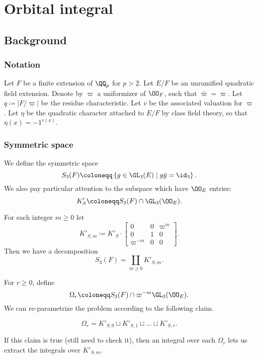 \chapter{Orbital integral}
\section{Background}
\label{sec:orbital_background}

\subsection{Notation}
\begin{itemize}
  \ii Let $F$ be a finite extension of $\QQ_p$ for $p > 2$.
  \ii Let $E/F$ be an unramified quadratic field extension.
  \ii Denote by $\varpi$ a uniformizer of $\OO_F$, such that $\bar \varpi = \varpi$.
  \ii Let $q \coloneqq |F/\varpi|$ be the residue characteristic.
  \ii Let $v$ be the associated valuation for $\varpi$.
  \ii Let $\eta$ be the quadratic character attached to $E/F$ by class field theory,
  so that $\eta(x) = -1^{v(x)}$.
\end{itemize}

\subsection{Symmetric space}
We define the symmetric space
\[ S_3(F) \coloneqq \left\{ g \in \GL_3(E) \mid g \bar{g} = \id_3 \right\}. \]
We also pay particular attention to the subspace which have $\OO_E$ entries:
\[ K'_S \coloneqq S_3(F) \cap \GL_3(\OO_E). \]
\begin{lemma}
  For each integer $m \ge 0$ let
  \[ K'_{S,m} \coloneqq K'_S \cdot \begin{bmatrix} 0 & 0 & \varpi^m \\ 0 & 1 & 0 \\ \varpi^{-m} & 0 & 0 \end{bmatrix}. \]
  Then we have a decomposition
  \[ S_3(F) = \coprod_{m \geq 0} K'_{S,m}. \]
\end{lemma}
For $r \geq 0$, define
\[ \Omega_r \coloneqq S_3(F) \cap \varpi^{-m} \GL_3(\OO_E). \]
We can re-parametrize the problem according to the following claim.
\begin{claim}
  \[ \Omega_r = K'_{S,0} \sqcup K'_{S,1} \sqcup \dots \sqcup K'_{S,r}. \]
\end{claim}
If this claim is true (still need to check it),
then an integral over each $\Omega_r$ lets us extract the integrals over $K'_{S,m}$.

